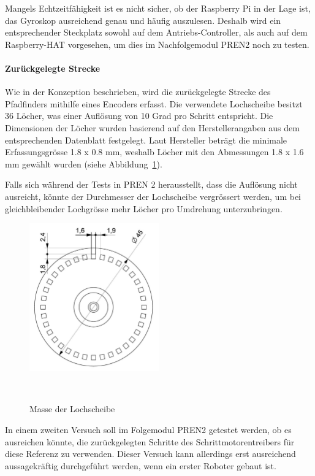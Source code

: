 \documentclass[main.tex]{subfiles} %
\begin{document}
Mangels Echtzeitfähigkeit ist es nicht sicher, ob der Raspberry Pi in der Lage
ist, das Gyroskop ausreichend genau und häufig auszulesen. Deshalb wird ein
entsprechender Steckplatz sowohl auf dem Antriebs-Controller, als auch auf dem
Raspberry-HAT vorgesehen, um dies im Nachfolgemodul PREN2 noch zu testen.

\paragraph{Zurückgelegte Strecke}
Wie in der Konzeption beschrieben, wird die zurückgelegte Strecke des 
Pfadfinders mithilfe eines Encoders erfasst. Die verwendete Lochscheibe 
besitzt 36 Löcher, was einer Auflösung von 10 Grad pro Schritt entspricht. 
Die Dimensionen der Löcher wurden basierend auf den Herstellerangaben aus 
dem entsprechenden Datenblatt festgelegt. Laut Hersteller beträgt die 
minimale Erfassungsgrösse 1.8 x 0.8 mm, weshalb Löcher mit den Abmessungen 
1.8 x 1.6 mm gewählt wurden 
(siehe Abbildung~\ref{fig:Lochscheibe_Vermasst}).

Falls sich während der Tests in PREN 2 herausstellt, dass die Auflösung nicht 
ausreicht, könnte der Durchmesser der Lochscheibe vergrössert werden, um bei 
gleichbleibender Lochgrösse mehr Löcher pro Umdrehung unterzubringen.

\begin{figure}[H]
    \centering
    \includegraphics[width=0.5\textwidth]{./fig_Strecke_Tracken/Encoderscheibe_Vermasst.pdf}
    \caption{Masse der Lochscheibe}~\label{fig:Lochscheibe_Vermasst}
\end{figure}

In einem zweiten Versuch soll im Folgemodul PREN2 getestet werden, ob es
ausreichen könnte, die zurückgelegten Schritte des Schrittmotorentreibers für
diese Referenz zu verwenden. Dieser Versuch kann allerdings erst ausreichend
aussagekräftig durchgeführt werden, wenn ein erster Roboter gebaut ist.
\end{document}
